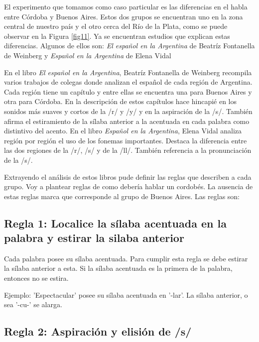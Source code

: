 \documentclass[11pt,a4paper,twoside]{tesis}
\begin{document}
El experimento que tomamos como caso particular es las diferencias en el habla entre Córdoba y Buenos Aires. Estos dos grupos se encuentran uno en la zona central de nuestro país y el otro cerca del Río de la Plata, como se puede observar en la Figura \ref{fig11}. Ya se encuentran estudios que explican estas diferencias. Algunos de ellos son: \textit{El español en la Argentina} de Beatríz Fontanella de Weinberg  y \textit{Español en la Argentina} de Elena Vidal  

En el libro \textit{El español en la Argentina}, Beatríz Fontanella de Weinberg recompila varios trabajos de colegas donde analizan el español de cada región de Argentina. Cada región tiene un capítulo y entre ellas se encuentra una para Buenos Aires y otra para Córdoba. En la descripción de estos capítulos hace hincapié en los sonidos más suaves y cortos de la /r/ y /y/ y en la aspiración de la /s/. También afirma el estiramiento de la sílaba anterior a la acentuada en cada palabra como distintivo del acento. En el libro \textit{Español en la Argentina}, Elena Vidal analiza región por región el uso de los fonemas importantes. Destaca la diferencia entre las dos regiones de la /r/, /s/ y de la /ll/. También referencia a la pronunciación de la /s/.

Extrayendo el análisis de estos libros pude definir las reglas que describen a cada grupo. Voy a plantear reglas de como debería hablar un cordobés. La ausencia de estas reglas marca que corresponde al grupo de Buenos Aires. Las reglas son: 

\subsection*{Regla 1: Localice la sílaba acentuada en la palabra y estirar la silaba anterior}

Cada palabra posee su sílaba acentuada. Para cumplir esta regla se debe estirar la sílaba anterior a esta. Si la sílaba acentuada es la primera de la palabra, entonces no se estira. 

Ejemplo: 'Espectacular' posee su sílaba acentuada en '-lar'. La sílaba anterior, o sea '-cu-' se alarga. 


\subsection*{Regla 2: Aspiración y elisión de /s/}
\end{document}
